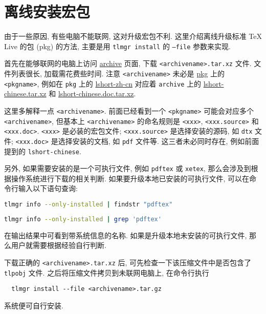 
\chapter{离线安装宏包}

由于一些原因,
有些电脑不能联网,
这对升级宏包不利.
这里介绍离线升级标准 \TeX{} Live 的包 (pkg) 的方法,
主要是用 \texttt{tlmgr install} 的 \texttt{--file} 参数来实现.

首先在能够联网的电脑上访问
\href{https://ctan.org/tex-archive/systems/texlive/tlnet/archive}{archive}
页面, 下载 \texttt{<archivename>.tar.xz} 文件.
文件列表很长, 加载需花费些时间.
注意 \texttt{<archivename>} 未必是 \href{https://ctan.org/pkg/}{pkg} 上的 \texttt{<pkgname>},
例如在 \texttt{pkg} 上的
\href{https://ctan.org/pkg/lshort-zh-cn}{lshort-zh-cn}
对应着 \texttt{archive} 上的
\href{http://mirrors.ctan.org/systems/texlive/tlnet/archive/lshort-chinese.tar.xz}{lshort-chinese.tar.xz}
和
\href{http://mirrors.ctan.org/systems/texlive/tlnet/archive/lshort-chinese.doc.tar.xz}{lshort-chinese.doc.tar.xz}.

这里多解释一点 \texttt{<archivename>}.
前面已经看到一个 \texttt{<pkgname>} 可能会对应多个 \texttt{<archivename>},
但基本上 \texttt{<archivename>} 的命名规则是 \texttt{<xxx>},
\texttt{<xxx.source>} 和 \texttt{<xxx.doc>}.
\texttt{<xxx>} 是必装的宏包文件;
\texttt{<xxx.source>} 是选择安装的源码, 如 \texttt{dtx} 文件;
\texttt{<xxx.doc>} 是选择安装的文档, 如 \texttt{pdf} 文件等.
这三者未必同时存在, 例如前面提到的 \texttt{lshort-chinese}.

另外, 如果需要安装的是一个可执行文件, 例如 \texttt{pdftex} 或 \texttt{xetex},
那么会涉及到根据操作系统进行下载的相关判断.
如果要升级本地已安装的可执行文件, 可以在命令行输入以下语句查询:
\begin{lstlisting}[language=bash, title={\small\sffamily Windows 系统}]
  tlmgr info --only-installed | findstr "pdftex"
\end{lstlisting}
\begin{lstlisting}[language=bash, title={\small\sffamily Ubuntu 和 Mac 系统}]
  tlmgr info --only-installed | grep 'pdftex'
\end{lstlisting}
在输出结果中可看到带系统信息的名称.
如果是升级本地未安装的可执行文件,
那么用户就需要根据经验自行判断.

下载正确的 \texttt{<archivename>.tar.xz} 后,
可先检查一下该压缩文件中是否包含了 \texttt{tlpobj} 文件.
之后将压缩文件拷贝到未联网电脑上,
在命令行执行
\begin{lstlisting} 
  tlmgr install --file <archivename>.tar.gz 
\end{lstlisting}
系统便可自行安装.